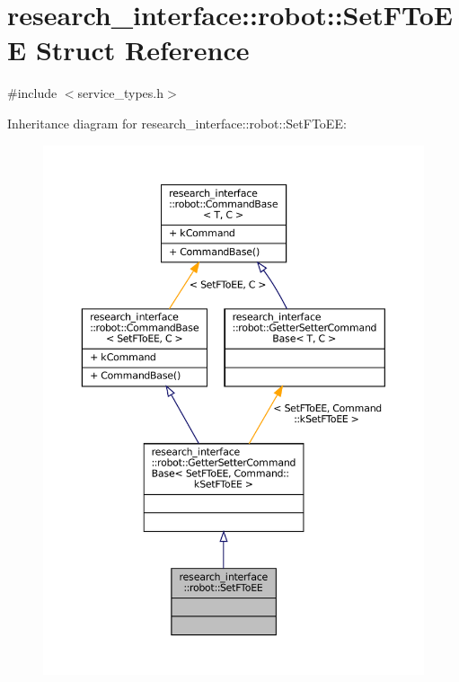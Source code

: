 \hypertarget{structresearch__interface_1_1robot_1_1SetFToEE}{}\section{research\+\_\+interface\+:\+:robot\+:\+:Set\+F\+To\+EE Struct Reference}
\label{structresearch__interface_1_1robot_1_1SetFToEE}


{\ttfamily \#include $<$service\+\_\+types.\+h$>$}



Inheritance diagram for research\+\_\+interface\+:\+:robot\+:\+:Set\+F\+To\+EE\+:
\nopagebreak
\begin{figure}[H]
\begin{center}
\leavevmode
\includegraphics[width=350pt]{structresearch__interface_1_1robot_1_1SetFToEE__inherit__graph}
\end{center}
\end{figure}


